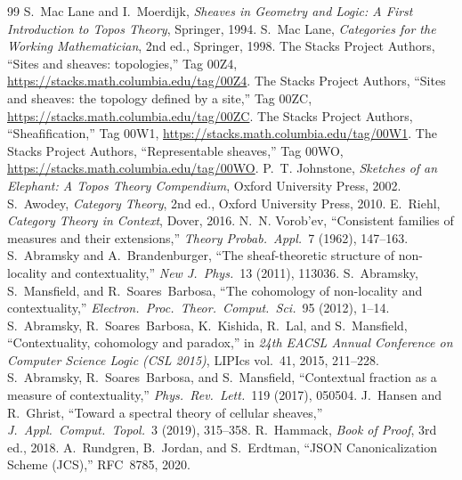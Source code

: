 \begin{thebibliography}{99}
 S.~Mac Lane and I.~Moerdijk, \emph{Sheaves in Geometry and Logic: A First Introduction to Topos Theory}, Springer, 1994.
 S.~Mac Lane, \emph{Categories for the Working Mathematician}, 2nd ed., Springer, 1998.
 The Stacks Project Authors, ``Sites and sheaves: topologies,'' Tag 00Z4, \url{https://stacks.math.columbia.edu/tag/00Z4}.
 The Stacks Project Authors, ``Sites and sheaves: the topology defined by a site,'' Tag 00ZC, \url{https://stacks.math.columbia.edu/tag/00ZC}.
 The Stacks Project Authors, ``Sheafification,'' Tag 00W1, \url{https://stacks.math.columbia.edu/tag/00W1}.
 The Stacks Project Authors, ``Representable sheaves,'' Tag 00WO, \url{https://stacks.math.columbia.edu/tag/00WO}.
 P.~T. Johnstone, \emph{Sketches of an Elephant: A Topos Theory Compendium}, Oxford University Press, 2002.
 S.~Awodey, \emph{Category Theory}, 2nd ed., Oxford University Press, 2010.
 E.~Riehl, \emph{Category Theory in Context}, Dover, 2016.
 N.~N. Vorob'ev, ``Consistent families of measures and their extensions,'' \emph{Theory Probab.\ Appl.}\ 7 (1962), 147--163.
 S.~Abramsky and A.~Brandenburger, ``The sheaf-theoretic structure of non-locality and contextuality,'' \emph{New J.\ Phys.}\ 13 (2011), 113036.
 S.~Abramsky, S.~Mansfield, and R.~Soares~Barbosa, ``The cohomology of non-locality and contextuality,'' \emph{Electron.\ Proc.\ Theor.\ Comput.\ Sci.}\ 95 (2012), 1--14.
 S.~Abramsky, R.~Soares~Barbosa, K.~Kishida, R.~Lal, and S.~Mansfield, ``Contextuality, cohomology and paradox,'' in \emph{24th EACSL Annual Conference on Computer Science Logic (CSL 2015)}, LIPIcs vol.~41, 2015, 211--228.
 S.~Abramsky, R.~Soares~Barbosa, and S.~Mansfield, ``Contextual fraction as a measure of contextuality,'' \emph{Phys.\ Rev.\ Lett.}\ 119 (2017), 050504.
 J.~Hansen and R.~Ghrist, ``Toward a spectral theory of cellular sheaves,'' \emph{J.\ Appl.\ Comput.\ Topol.}\ 3 (2019), 315--358.
 R.~Hammack, \emph{Book of Proof}, 3rd ed., 2018.
 A.~Rundgren, B.~Jordan, and S.~Erdtman, ``JSON Canonicalization Scheme (JCS),'' RFC~8785, 2020.
\end{thebibliography}
